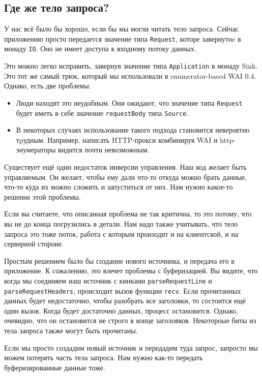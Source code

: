 \subsection{Где же тело запроса?}
У нас всё было бы хорошо, если бы мы могли читать тело запроса. Сейчас
приложению просто передается значение типа \lstinline'Request', которе 
завернутоe в монаду \lstinline'IO'. 
Оно не имеет доступа к входному потоку данных.

Это можно легко исправить, завернув значение типа \lstinline'Application' в монаду Sink. 
Это тот же самый трюк, который мы использовали в enumerator-based WAI 0.4. 
Однако, есть две проблемы:

\begin{itemize}
\item Люди находят это неудобным. Они ожидают, что значение типа 
\lstinline'Request' будет иметь в себе значение \lstinline'requestBody' типа 
\lstinline'Source'.
\item В некоторых случаях использование такого подхода становится невероятно 
тpудным. Например, написать HTTP-прокси комбинируя WAI и http-энумераторы 
видится почти невозможным.
\end{itemize}
Существует ещё один недостаток инверсии управления. Наш код желает быть 
управляемым. Он желает, чтобы ему дали что-то откуда можно брать данные, что-то 
куда их можно сложить и запуститься от них. Нам нужно какое-то решение этой проблемы.
\begin{remark}
Если вы считаете, что описанная проблема не так критична, то это потому, что вы не до
 конца погрузились в детали. Нам надо также учитывать, что тело запроса это тоже поток,
работа с которым произодит и на клиентской, и на серверной стороне.
\end{remark}
Простым решением было бы создание нового источника, и передача его в приложение.
К сожалению, это влечет проблемы с буферизацией. Вы видите, что когда мы соединяем 
наш источник с кинками \lstinline'parseRequestLine' и \lstinline'parseRequestHeaders',
происходит вызов функции \lstinline'recv'.
Если прочитанных данных будет недостаточно, чтобы разобрать все заголовки, то 
состоится ещё один вызов. Когда будет достаточно данных, процесс остановится. 
Однако, очевидно, что он остановится не строго в конце заголовков. Некотороые 
биты из тела запроса также могут быть прочитаны.

Если мы просто создадим новый источник и передадим туда запрос, запросто мы можем 
потерять часть тела запроса. Нам нужно как-то передать буферизированные данные 
тоже.

